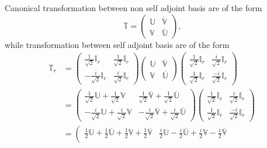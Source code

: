 \documentclass[aps, preprint]{revtex4}
\begin{document}
Canonical transformation between non self adjoint basis
are of the form
\begin{equation}\mathbb{T} =\left (\begin{array}{cc}\mathbb{U} & \overline{\mathbb{V}} \\
\mathbb{V} & \overline{\mathbb{U}}\end{array}\right )\text{,}
\end{equation}while transformation between self adjoint basis are of the form
\begin{align}\mathbb{T}_{r} &  =\left (\begin{array}{cc}\frac{1}{\sqrt{2}} \mathbb{I}_{r} & \frac{1}{\sqrt{2}} \mathbb{I}_{r} \\
 -\frac{i}{\sqrt{2}} \mathbb{I}_{r} & \frac{i}{\sqrt{2}} \mathbb{I}_{r}\end{array}\right ) \left (\begin{array}{cc}\mathbb{U} & \overline{\mathbb{V}} \\
\mathbb{V} & \overline{\mathbb{U}}\end{array}\right ) \left (\begin{array}{cc}\frac{1}{\sqrt{2}} \mathbb{I}_{r} & \frac{i}{\sqrt{2}} \mathbb{I}_{r} \\
\frac{1}{\sqrt{2}} \mathbb{I}_{r} & \frac{ -i}{\sqrt{2}} \mathbb{I}_{r}\end{array}\right ) \\
 &  =\left (\begin{array}{cc}\frac{1}{\sqrt{2}} \mathbb{U} +\frac{1}{\sqrt{2}} \mathbb{V} & \frac{1}{\sqrt{2}} \overline{\mathbb{V}} +\frac{1}{\sqrt{2}} \overline{\mathbb{U}} \\
 -\frac{i}{\sqrt{2}} \mathbb{U} +\frac{i}{\sqrt{2}} \mathbb{V} &  -\frac{i}{\sqrt{2}} \overline{\mathbb{V}} +\frac{i}{\sqrt{2}} \overline{\mathbb{U}}\end{array}\right ) \left (\begin{array}{cc}\frac{1}{\sqrt{2}} \mathbb{I}_{r} & \frac{i}{\sqrt{2}} \mathbb{I}_{r} \\
\frac{1}{\sqrt{2}} \mathbb{I}_{r} & \frac{ -i}{\sqrt{2}} \mathbb{I}_{r}\end{array}\right ) \\
 &  =\left (\begin{array}{cc}\frac{1}{2} \mathbb{U} +\frac{1}{2} \overline{\mathbb{U}} +\frac{1}{2} \mathbb{V} +\frac{1}{2} \overline{\mathbb{V}} & \frac{i}{2} \mathbb{U} -\frac{i}{2} \overline{\mathbb{U}} +\frac{i}{2} \mathbb{V} -\frac{i}{2} \overline{\mathbb{V}} \\

\end{array}
\end{align}
\end{document}

